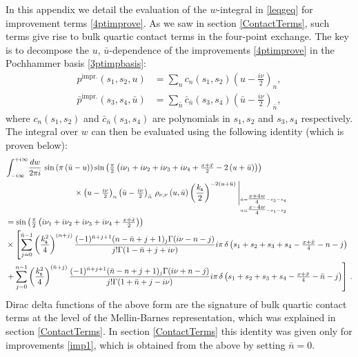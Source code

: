 \documentclass[11pt,a4paper]{article}
\begin{document}
In this appendix we detail the evaluation of the $w$-integral in \eqref{leqgeq} for improvement terms \eqref{4ptimprove}. As we saw in section \ref{ContactTerms}, such terms give rise to bulk quartic contact terms in the four-point exchange. The key is to decompose the $u$, ${\bar u}$-dependence of the improvements \eqref{4ptimprove} in the Pochhammer basis \eqref{3ptimpbasis}:
\begin{subequations}
\begin{align}\label{imp1}
    p^{\text{impr.}}\left(s_1,s_2,u\right) &= \sum_{n}c_{n}\left(s_1,s_2\right)\left(u-\tfrac{i\nu}{2}\right)_n,\\
    {\bar p}^{\text{impr.}}\left(s_3,s_4,{\bar u}\right) &= \sum_{{\bar n}}{\bar c}_{{\bar n}}\left(s_3,s_4\right)\left({\bar u}-\tfrac{i\nu}{2}\right)_{\bar n},
\end{align}
\end{subequations}
where $c_{n}\left(s_1,s_2\right)$ and ${\bar c}_{{\bar n}}\left(s_3,s_4\right)$ are polynomials in $s_1, s_2$ and $s_3, s_4$ respectively. The integral over $w$ can then be evaluated using the following identity (which is proven below):
\begin{align}\label{Uint2}
\int^{+i\infty}_{-i\infty} & \frac{dw}{2\pi i}\,\sin \left(\pi \left({\bar u}-u\right)\right)\sin \left(\tfrac{\pi}{2}  \left(i \nu_1+i \nu_2+i \nu_3+i \nu_4+\tfrac{x+{\bar x}}{2}-2\left(u+{\bar u}\right)\right)\right)\\ \nonumber
& \hspace*{2cm}\times \left(u-\tfrac{i\nu}{2}\right)_n\left({\bar u}-\tfrac{i\nu}{2}\right)_{\bar n}\,\rho_{\nu,\nu}\left(u,{\bar u}\right)\left(\frac{k_{\sf s}}{2}\right)^{-2\left(u+{\bar u}\right)}\Bigg|_{{}^{{\bar u}=\tfrac{x+4w}{4}-s_3-s_4}_{u=\tfrac{x-4w}{4}-s_1-s_2}} \\\nonumber&\hspace*{-1cm}=\sin \left(\tfrac{\pi}{2} \left( i\nu_1+i\nu_2+i\nu_3+i\nu_4+\tfrac{x+{\bar x}}{2}\right)\right)\\
\nonumber&\hspace*{-1cm}\times \left[\sum_{j=0}^{\bar{n}-1}\left(\frac{k^2_{\sf s}}{4}\right)^{(n+j)}\frac{(-1)^{\bar{n}+j+1}  (n-\bar{n}+j+1)_j \Gamma (i\nu-n-j)}{j! \Gamma (1-\bar{n}+j+i \nu )}i \pi\,\delta\left(s_1+s_2+s_3+s_4-\tfrac{x+\bar{x}}4-n-j\right)\right.
\\\nonumber&\left.\hspace*{-1cm}+\sum_{j=0}^{{n}-1}\left(\frac{k^2_{\sf s}}{4}\right)^{({\bar n}+j)}\frac{(-1)^{\bar{n}+j+1}  (\bar{n}-n+j+1)_j \Gamma (i\nu+n-j )}{j! \Gamma (1+\bar{n}+j-i \nu )}i \pi\,\delta\left(s_1+s_2+s_3+s_4-\tfrac{x+\bar{x}}4-\bar{n}-j\right)\right]\,.\nonumber
\end{align}
Dirac delta functions of the above form are the signature of bulk quartic contact terms at the level of the Mellin-Barnes representation, which was explained in section \ref{ContactTerms}. In section \ref{ContactTerms} this identity was given only for improvements \eqref{imp1}, which is obtained from the above by setting ${\bar n}=0$.
\end{document}
